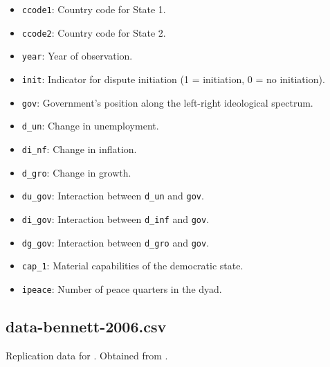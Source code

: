 \documentclass[12pt]{article}
\begin{document}
\begin{itemize}
  \item \texttt{ccode1}: Country code for State 1.
  \item \texttt{ccode2}: Country code for State 2.
  \item \texttt{year}: Year of observation.
  \item \texttt{init}: Indicator for dispute initiation (1 = initiation, 0 = no initiation).
  \item \texttt{gov}: Government's position along the left-right ideological spectrum. 
  \item \texttt{d\_un}: Change in unemployment.
  \item \texttt{di\_nf}: Change in inflation.
  \item \texttt{d\_gro}: Change in growth.
  \item \texttt{du\_gov}: Interaction between \texttt{d\_un} and \texttt{gov}.
  \item \texttt{di\_gov}: Interaction between \texttt{d\_inf} and \texttt{gov}.
  \item \texttt{dg\_gov}: Interaction between \texttt{d\_gro} and \texttt{gov}.
  \item \texttt{cap\_1}: Material capabilities of the democratic state.
  \item \texttt{ipeace}: Number of peace quarters in the dyad.
\end{itemize}

\subsection{data-bennett-2006.csv}

Replication data for \citet{Bennett:2006gp}.
Obtained from \citet{bennett2006data}.
\end{document}
